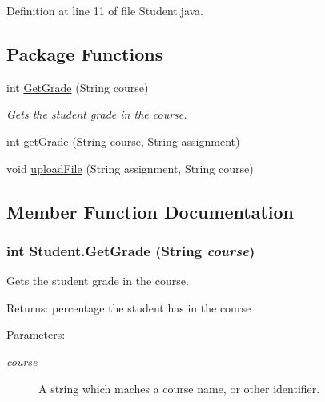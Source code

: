 Definition at line 11 of file Student.java.\subsection*{Package Functions}
\begin{CompactItemize}
\item 
int \hyperlink{classStudent_60f364b24520f426e98c29d3b22d2473}{GetGrade} (String course)
\begin{CompactList}\small\item\em Gets the student grade in the course. \item\end{CompactList}\item 
int \hyperlink{classStudent_0442c58d0755dda4022826fc0dc50cf3}{getGrade} (String course, String assignment)
\item 
void \hyperlink{classStudent_af9021e3fa44f6a01a57ce1c9b9f92ea}{uploadFile} (String assignment, String course)
\end{CompactItemize}


\subsection{Member Function Documentation}
\hypertarget{classStudent_60f364b24520f426e98c29d3b22d2473}{
\subsubsection{\setlength{\rightskip}{0pt plus 5cm}int Student.GetGrade (String {\em course})}}
\label{classStudent_60f364b24520f426e98c29d3b22d2473}


Gets the student grade in the course. 

\begin{Desc}
\item[Returns:]percentage the student has in the course \end{Desc}
\begin{Desc}
\item[Parameters:]
\begin{description}
\item[{\em course}]A string which maches a course name, or other identifier. \end{description}
\end{Desc}


